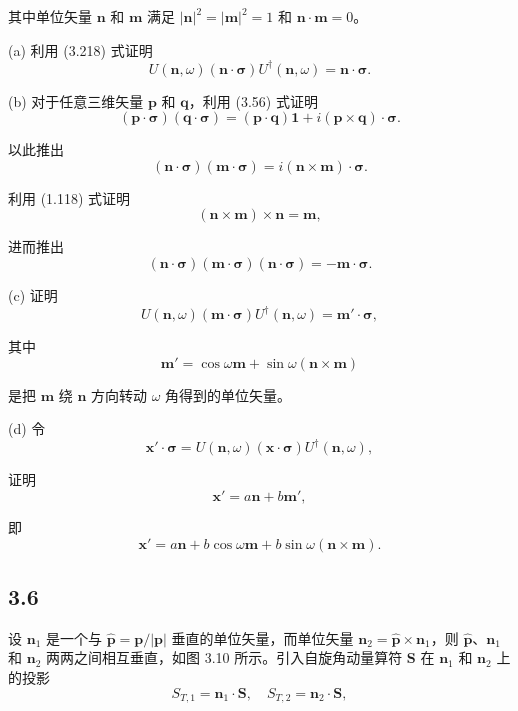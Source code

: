 其中单位矢量 $ \mathbf{n} $ 和 $ \mathbf{m} $ 满足 $ |\mathbf{n}|^2 = |\mathbf{m}|^2 = 1 $ 和 $ \mathbf{n} \cdot \mathbf{m} = 0 $。

(a) 利用 (3.218) 式证明
$$ U(\mathbf{n}, \omega) (\mathbf{n} \cdot \boldsymbol{\sigma}) U^\dagger(\mathbf{n}, \omega) = \mathbf{n} \cdot \boldsymbol{\sigma}. $$

(b) 对于任意三维矢量 $ \mathbf{p} $ 和 $ \mathbf{q} $，利用 (3.56) 式证明
$$ (\mathbf{p} \cdot \boldsymbol{\sigma}) (\mathbf{q} \cdot \boldsymbol{\sigma}) = (\mathbf{p} \cdot \mathbf{q}) \mathbf{1} + i (\mathbf{p} \times \mathbf{q}) \cdot \boldsymbol{\sigma}. $$

以此推出
$$ (\mathbf{n} \cdot \boldsymbol{\sigma}) (\mathbf{m} \cdot \boldsymbol{\sigma}) = i (\mathbf{n} \times \mathbf{m}) \cdot \boldsymbol{\sigma}. $$

利用 (1.118) 式证明
$$ (\mathbf{n} \times \mathbf{m}) \times \mathbf{n} = \mathbf{m}, $$

进而推出
$$ (\mathbf{n} \cdot \boldsymbol{\sigma}) (\mathbf{m} \cdot \boldsymbol{\sigma}) (\mathbf{n} \cdot \boldsymbol{\sigma}) = -\mathbf{m} \cdot \boldsymbol{\sigma}. $$

(c) 证明
$$ U(\mathbf{n}, \omega) (\mathbf{m} \cdot \boldsymbol{\sigma}) U^\dagger(\mathbf{n}, \omega) = \mathbf{m}' \cdot \boldsymbol{\sigma}, $$

其中
$$ \mathbf{m}' = \cos \omega \mathbf{m} + \sin \omega (\mathbf{n} \times \mathbf{m}) $$

是把 $ \mathbf{m} $ 绕 $ \mathbf{n} $ 方向转动 $ \omega $ 角得到的单位矢量。

(d) 令
$$ \mathbf{x}' \cdot \boldsymbol{\sigma} = U(\mathbf{n}, \omega) (\mathbf{x} \cdot \boldsymbol{\sigma}) U^\dagger(\mathbf{n}, \omega), $$

证明
$$ \mathbf{x}' = a \mathbf{n} + b \mathbf{m}', $$

即
$$ \mathbf{x}' = a \mathbf{n} + b \cos \omega \mathbf{m} + b \sin \omega (\mathbf{n} \times \mathbf{m}). $$

\newpage
\subsection{3.6}
设 $ \mathbf{n}_1 $ 是一个与 $ \hat{\mathbf{p}} = \mathbf{p}/|\mathbf{p}| $ 垂直的单位矢量，而单位矢量 $ \mathbf{n}_2 = \hat{\mathbf{p}} \times \mathbf{n}_1 $，则 $ \hat{\mathbf{p}} $、$ \mathbf{n}_1 $ 和 $ \mathbf{n}_2 $ 两两之间相互垂直，如图 3.10 所示。引入自旋角动量算符 $ \mathbf{S} $ 在 $ \mathbf{n}_1 $ 和 $ \mathbf{n}_2 $ 上的投影
$$ S_{T,1} = \mathbf{n}_1 \cdot \mathbf{S}, \quad S_{T,2} = \mathbf{n}_2 \cdot \mathbf{S}, \tag{3.244} $$

